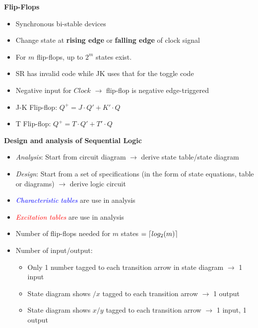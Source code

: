 \documentclass[a4paper]{article} \usepackage[backend=biber, style=numeric, sorting=none]{biblatex}
\DeclarePairedDelimiter\ceil{\lceil}{\rceil}
\begin{document}
\begin{multicols*}{4}
\begin{itemize}
\begin{center}
    \end{center}
\end{itemize}
\textbf{Flip-Flops}
\begin{itemize}
    \item Synchronous bi-stable devices
    \item Change state at \textbf{rising edge} or \textbf{falling edge} of clock signal
    \item For $m$ flip-flops, up to $2^m$ states exist.
    \item SR has invalid code while JK uses that for the toggle code
    \item Negative input for $Clock$ $\rightarrow$ flip-flop is negative edge-triggered
    \item J-K Flip-flop: $Q^+=J\cdot Q' + K'\cdot Q$
    \item T Flip-flop: $Q^+ = T\cdot Q' + T'\cdot Q$
\end{itemize}
\columnbreak
\textbf{Design and analysis of Sequential Logic}
\begin{itemize}
    \item \textit{Analysis}: Start from circuit diagram $\rightarrow$ derive state table/state diagram
    \item \textit{Design}: Start from a set of specifications (in the form of state equations, table or diagrams) $\rightarrow$ derive logic circuit
    \item \textcolor{blue}{\textit{Characteristic tables}} are use in analysis
    \item \textcolor{red}{\textit{Excitation tables}} are use in analysis
    \item Number of flip-flops needed for $m$ states $=\ceil{log_2(m)}$
    \item Number of input/output:
        \begin{itemize}
            \item Only 1 number tagged to each transition arrow in state diagram $\rightarrow$ 1 input
            \item State diagram shows $/x$ tagged to each transition arrow $\rightarrow$ 1 output
            \item State diagram shows $x/y$ tagged to each transition arrow $\rightarrow$ 1 input, 1 output
        \end{itemize}
\end{itemize}


\end{multicols*}
\end{document}
